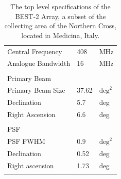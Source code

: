 \documentclass[useAMS,macros,usenatbib,onecolumn]{mn2e}
\begin{document}
\begin{table}
\begin{center}
\begin{tabular}{| l | l | l |}
\hline
Central Frequency 		&        408 &        MHz 	\\
Analogue Bandwidth 		&         16 &        MHz 	\\
				&            &            	\\
\hline
Primary Beam 			&            &           	\\
\hline
Primary Beam Size 		&      37.62 & $\textrm{deg}^2$ \\
Declination 			&        5.7 &        deg 	\\
Right Ascension 		&        6.6 &        deg 	\\
				&            &            	\\
\hline
PSF    				&            &       		\\
\hline
PSF FWHM 			&        0.9 & $\textrm{deg}^2$ \\
Declination 			&       0.52 &     deg 		\\
Right ascension 		&       1.73 &     deg 		\\
				&            &            	\\
\hline
\end{tabular}
\caption{The top level specifications of the BEST-2 Array, a subset of the collecting area of the Northern Cross, located in Medicina, Italy.}
\label{tbl:best2}
\end{center}
\end{table}
\end{document}
